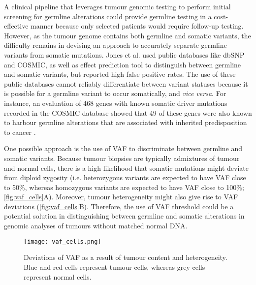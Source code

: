 A clinical pipeline that leverages tumour genomic testing to perform initial screening for germline alterations could provide germline testing in a cost-effective manner because only selected patients would require follow-up testing. However, as the tumour genome contains both germline and somatic variants, the difficulty remains in devising an approach to accurately separate germline variants from somatic mutations. Jones et al. \cite{Jones2015a} used public databases like \acs{dbSNP} and \acs{COSMIC}, as well as effect prediction tool to distinguish between germline and somatic variants, but reported high false positive rates. The use of these public databases cannot reliably differentiate between variant statuses because it is possible for a germline variant to occur somatically, and \textit{vice versa}. For instance, an evaluation of 468 genes with known somatic driver mutations recorded in the COSMIC database showed that 49 of these genes were also known to harbour germline alterations that are associated with inherited predisposition to cancer \cite{Rahman2014}.

One possible approach is the use of VAF to discriminate between germline and somatic variants. Because tumour biopsies are typically admixtures of tumour and normal cells, there is a high likelihood that somatic mutations might deviate from diploid zygosity (i.e. heterozygous variants are expected to have VAF close to 50\%, whereas homozygous variants are expected to have VAF close to 100\%; \autoref{fig:vaf_cells}A). Moreover, tumour heterogeneity might also give rise to VAF deviations (\autoref{fig:vaf_cells}B). Therefore, the use of VAF threshold could be a potential solution in distinguishing between germline and somatic alterations in genomic analyses of tumours without matched normal DNA.


\begin{figure}[H]
	\centering
	\texttt{[image: vaf\_cells.png]}
	\caption[Deviations of VAF as a result of tumour content and heterogeneity.]{Deviations of VAF as a result of tumour content and heterogeneity. Blue and red cells represent tumour cells, whereas grey cells represent normal cells.}
	\label{fig:vaf_cells}
\end{figure}


